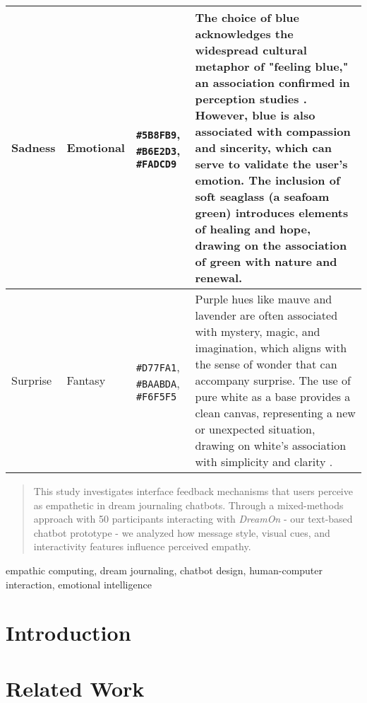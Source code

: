\documentclass[conference]{IEEEtran}
\begin{document}
\begin{table*}[t]
\begin{tabular}{|p{}|p{}|p{}|p{}|}
			\hline
			Sadness & Emotional & \cellcolor{sadnessPrimary}\texttt{\#5B8FB9}, \cellcolor{sadnessSecondary}\texttt{\#B6E2D3}, \cellcolor{sadnessAccent}\texttt{\#FADCD9} & The choice of blue acknowledges the widespread cultural metaphor of "feeling blue," an association confirmed in perception studies \cite{b7}. However, blue is also associated with compassion and sincerity, which can serve to validate the user's emotion. The inclusion of soft seaglass (a seafoam green) introduces elements of healing and hope, drawing on the association of green with nature and renewal. \\
			\hline
			Surprise & Fantasy & \cellcolor{surprisePrimary}\texttt{\#D77FA1}, \cellcolor{surpriseSecondary}\texttt{\#BAABDA}, \cellcolor{surpriseAccent}\texttt{\#F6F5F5} & Purple hues like mauve and lavender are often associated with mystery, magic, and imagination, which aligns with the sense of wonder that can accompany surprise. The use of pure white as a base provides a clean canvas, representing a new or unexpected situation, drawing on white's association with simplicity and clarity \cite{b6}. \\
			\hline
		\end{tabular}
	\end{table*}
	
	\begin{abstract}
		This study investigates interface feedback mechanisms that users perceive as empathetic in dream journaling chatbots. Through a mixed-methods approach with 50 participants interacting with \textit{DreamOn} - our text-based chatbot prototype - we analyzed how message style, visual cues, and interactivity features influence perceived empathy.
	\end{abstract}
	
	\begin{IEEEkeywords}
		empathic computing, dream journaling, chatbot design, human-computer interaction, emotional intelligence
	\end{IEEEkeywords}
	
	\section{Introduction}
	
	\section{Related Work}
	
\end{document}
